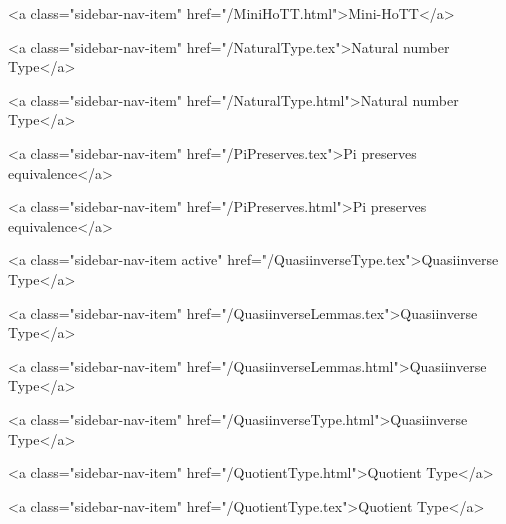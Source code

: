       
        
          <a class="sidebar-nav-item" href="/MiniHoTT.html">Mini-HoTT</a>
        
      
    
      
        
          <a class="sidebar-nav-item" href="/NaturalType.tex">Natural number Type</a>
        
      
    
      
        
          <a class="sidebar-nav-item" href="/NaturalType.html">Natural number Type</a>
        
      
    
      
        
          <a class="sidebar-nav-item" href="/PiPreserves.tex">Pi preserves equivalence</a>
        
      
    
      
        
          <a class="sidebar-nav-item" href="/PiPreserves.html">Pi preserves equivalence</a>
        
      
    
      
        
          <a class="sidebar-nav-item active" href="/QuasiinverseType.tex">Quasiinverse Type</a>
        
      
    
      
        
          <a class="sidebar-nav-item" href="/QuasiinverseLemmas.tex">Quasiinverse Type</a>
        
      
    
      
        
          <a class="sidebar-nav-item" href="/QuasiinverseLemmas.html">Quasiinverse Type</a>
        
      
    
      
        
          <a class="sidebar-nav-item" href="/QuasiinverseType.html">Quasiinverse Type</a>
        
      
    
      
        
          <a class="sidebar-nav-item" href="/QuotientType.html">Quotient Type</a>
        
      
    
      
        
          <a class="sidebar-nav-item" href="/QuotientType.tex">Quotient Type</a>
        
